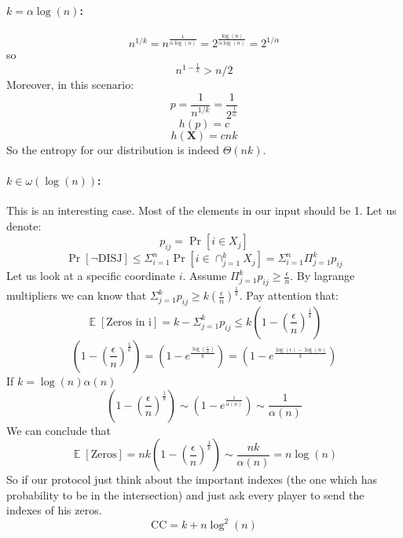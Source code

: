 \documentclass{article}
\newcommand{\rv}[1]{\mathbf{#1}}
\theoremstyle{plain}
\begin{document}
\paragraph{$k = \alpha\log(n)$:}
\begin{equation*}
    n^{1/k} = n^{\frac{1}{\alpha\log(n)}} = 2^{\frac{\log(n)}{\alpha\log(n)}} = 2^{1/\alpha}
\end{equation*}
so
\begin{equation*}
    n^{1-\frac{1}{k}} > n/2
\end{equation*}
Moreover, in this scenario:
\begin{equation*}
    p = \frac{1}{n^{1/k}} = \frac{1}{2^{\frac{1}{\alpha}}} 
\end{equation*}
\begin{equation*}
    h(p) = c 
\end{equation*}
\begin{equation*}
    h(\rv{X}) = cnk
\end{equation*}
So the entropy for our distribution is indeed $\Theta(nk)$.
\paragraph{$k \in \omega(\log(n))$:}
This is an interesting case. Most of the elements in our input should be 1. 
Let us denote:
\begin{equation*}
    p_{ij} = \Pr[i \in X_j]
\end{equation*}
\begin{equation*}
    \Pr[\neg \text{DISJ}] \leq \Sigma_{i=1}^{n}\Pr[i \in \cap_{j=1}^{k}X_j] = \Sigma_{i=1}^{n}\Pi_{j=1}^{k}p_{ij}
\end{equation*}
Let us look at a specific coordinate $i$. Assume $\Pi_{j=1}^{k}p_{ij} \geq \frac{\epsilon}{n}$.
By lagrange multipliers we can know that $\Sigma_{j=1}^{k}p_{ij} \geq k(\frac{\epsilon}{n})^{\frac{1}{k}}$.
Pay attention that:
\begin{equation*}
    \mathop{\mathbb{E}}[\text{Zeros in i}] = k - \Sigma_{j=1}^{k}p_{ij} \leq k \left(1 - \left(\frac{\epsilon}{n}\right)^{\frac{1}{k}}\right)
\end{equation*}
\begin{equation*}
    \left(1 - \left(\frac{\epsilon}{n}\right)^{\frac{1}{k}}\right) = \left(1 - e^{\frac{\log(\frac{\epsilon}{n})}{k}}\right) = \left(1 - e^{\frac{\log(\epsilon) -\log(n)}{k}}\right)
\end{equation*}
If $k = \log(n) \alpha(n)$
\begin{equation*}
    \left(1 - \left(\frac{\epsilon}{n}\right)^{\frac{1}{k}}\right) \sim \left(1 - e^{\frac{1}{\alpha(n)}}\right) \sim \frac{1}{\alpha(n)}
\end{equation*}
We can conclude that
\begin{equation*}
    \mathop{\mathbb{E}}[\text{Zeros}] = nk\left(1 - \left(\frac{\epsilon}{n}\right)^{\frac{1}{k}}\right) \sim \frac{nk}{\alpha(n)} = n\log(n)
\end{equation*}
So if our protocol just think about the important indexes (the one which has probability to be in the intersection) and just ask every player to send the indexes of his zeros.
\begin{equation*}
    \text{CC} = k + n\log^2(n)
\end{equation*}
\end{document}
